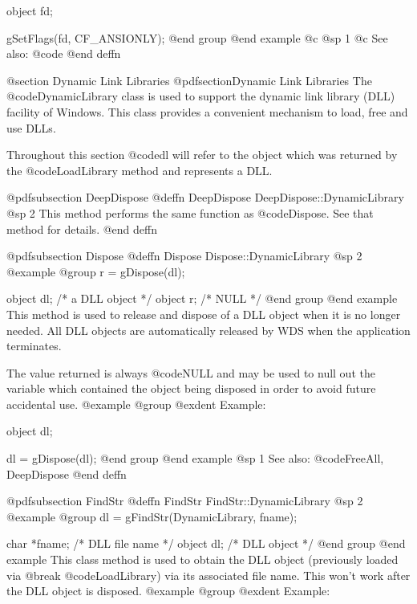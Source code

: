 object  fd;

gSetFlags(fd, CF_ANSIONLY);
@end group
@end example
@c @sp 1
@c See also:  @code{}
@end deffn






@section Dynamic Link Libraries
@pdfsection{Dynamic Link Libraries}
The @code{DynamicLibrary} class is used to support the dynamic link
library (DLL) facility of Windows.  This class provides a convenient
mechanism to load, free and use DLLs.

Throughout this section @code{dl} will refer to the object which was
returned by the @code{LoadLibrary} method and represents a DLL.








@pdfsubsection {DeepDispose}
@deffn {DeepDispose} DeepDispose::DynamicLibrary
@sp 2
This method performs the same function as @code{Dispose}.  See that
method for details.
@end deffn







@pdfsubsection {Dispose}
@deffn {Dispose} Dispose::DynamicLibrary
@sp 2
@example
@group
r = gDispose(dl);

object  dl;   /*  a DLL object  */
object  r;    /*  NULL          */
@end group
@end example
This method is used to release and dispose of a DLL object when it is no
longer needed.  All DLL objects are automatically released by WDS when
the application terminates.

The value returned is always @code{NULL} and may be used to null out
the variable which contained the object being disposed in order to
avoid future accidental use.
@example
@group
@exdent Example:

object  dl;

dl = gDispose(dl);
@end group
@end example
@sp 1
See also:  @code{FreeAll, DeepDispose}
@end deffn









@pdfsubsection {FindStr}
@deffn {FindStr} FindStr::DynamicLibrary
@sp 2
@example
@group
dl = gFindStr(DynamicLibrary, fname);

char    *fname; /*  DLL file name  */
object  dl;     /*  DLL object     */
@end group
@end example
This class method is used to obtain the DLL object (previously loaded via
@break @code{LoadLibrary}) via its associated file name.  This won't work
after the DLL object is disposed.
@example
@group
@exdent Example:

